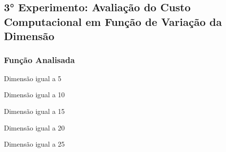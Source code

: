 

\subsection{3° Experimento: Avaliação do Custo Computacional em Função de Variação da Dimensão}
    \subsubsection{Função Analisada}

        \begin{minipage}[h!]{\linewidth}
            \centering
            Dimensão igual a 5
            \label{tab:tblo} 
            \writetable{\tblo}\par
            \bigskip
            \centering
            Dimensão igual a 10
            \label{tab:tblp} 
            \writetable{\tblp}\par
            \bigskip
            \centering
            Dimensão igual a 15
            \label{tab:tblq} 
            \writetable{\tblq}\par
            \bigskip
            \centering
            Dimensão igual a 20
            \label{tab:tblr} 
            \writetable{\tblr}\par
            \bigskip
            \centering
            Dimensão igual a 25
            \label{tab:tbls} 
            \writetable{\tbls}\par
        \end{minipage}
    
\newpage